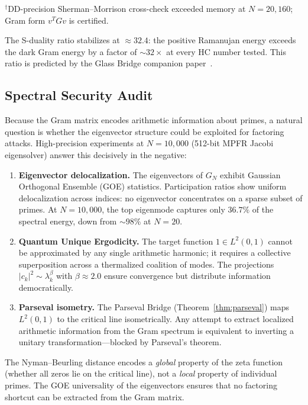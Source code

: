 \documentclass[11pt,a4paper]{article}
\begin{document}
\noindent
{\footnotesize $^\dagger$DD-precision Sherman--Morrison cross-check
exceeded memory at $N = 20{,}160$; Gram form $v^TGv$ is certified.}

\medskip\noindent
The S-duality ratio stabilizes at $\approx 32.4$: the positive
Ramanujan energy exceeds the dark Gram energy by a factor of
$\sim 32\times$ at every HC number tested. This ratio is predicted
by the Glass Bridge companion paper~\cite{glasspaper}.

\subsection{Spectral Security Audit}
\label{sec:spectral-security}

Because the Gram matrix encodes arithmetic information about primes,
a natural question is whether the eigenvector structure could be
exploited for factoring attacks. High-precision experiments at
$N = 10{,}000$ (512-bit MPFR Jacobi eigensolver) answer this
decisively in the negative:

\begin{enumerate}
  \item \textbf{Eigenvector delocalization.} The eigenvectors of $G_N$
    exhibit Gaussian Orthogonal Ensemble (GOE) statistics. Participation
    ratios show uniform delocalization across indices: no eigenvector
    concentrates on a sparse subset of primes. At $N = 10{,}000$,
    the top eigenmode captures only $36.7\%$ of the spectral energy,
    down from $\sim 98\%$ at $N = 20$.

  \item \textbf{Quantum Unique Ergodicity.} The target function
    $1 \in L^2(0,1)$ cannot be approximated by any single arithmetic
    harmonic; it requires a collective superposition across a
    thermalized coalition of modes. The projections
    $|c_k|^2 \sim \lambda_k^\beta$ with $\beta \approx 2.0$ ensure
    convergence but distribute information democratically.

  \item \textbf{Parseval isometry.} The Parseval Bridge
    (Theorem~\ref{thm:parseval}) maps $L^2(0,1)$ to the critical line
    isometrically. Any attempt to extract localized arithmetic
    information from the Gram spectrum is equivalent to inverting a
    unitary transformation---blocked by Parseval's theorem.
\end{enumerate}

\noindent
The Nyman--Beurling distance encodes a \emph{global} property of the
zeta function (whether all zeros lie on the critical line), not a
\emph{local} property of individual primes. The GOE universality
of the eigenvectors ensures that no factoring shortcut can be
extracted from the Gram matrix.
\end{document}
